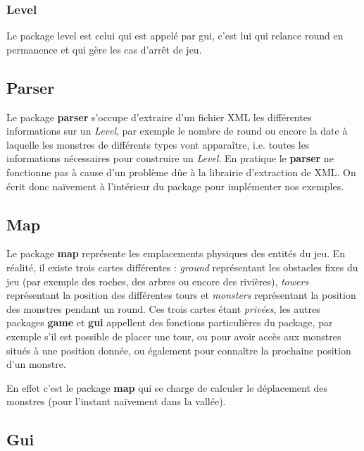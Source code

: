 \documentclass{article}
\begin{document}
\subsubsection{Level}
Le package level est celui qui est appelé par gui, c'est lui qui relance round en permanence et qui gère les cas d'arrêt de jeu.
\subsection{Parser}
Le package \textbf{parser} s'occupe d'extraire d'un fichier XML les différentes informations sur un \textit{Level}, par exemple le nombre de round ou encore la date à laquelle les monstres de différents types vont apparaître, i.e. toutes les informations nécessaires pour construire un \textit{Level}. En pratique le \textbf{parser} ne fonctionne pas à cause d'un problème dûe à la librairie d'extraction de XML. On écrit donc naïvement à l'intérieur du package pour implémenter nos exemples. 

\subsection{Map}
Le package \textbf{map} représente les emplacements physiques des entités du jeu. En réalité, il existe trois cartes différentes : \textit{ground} représentant les obstacles fixes du jeu (par exemple des roches, des arbres ou encore des rivières), \textit{towers} représentant la position des différentes tours et \textit{monsters} représentant la position des monstres pendant un round. Ces trois cartes étant \textit{privées}, les autres packages \textbf{game} et \textbf{gui} appellent des fonctions particulières du package, par exemple s'il est possible de placer une tour, ou pour avoir accès aux monstres situés à une position donnée, ou également pour connaître la prochaine position d'un monstre. 
\par
En effet c'est le package \textbf{map} qui se charge de calculer le déplacement des monstres (pour l'instant naïvement dans la vallée). 


\subsection{Gui}
\end{document}
